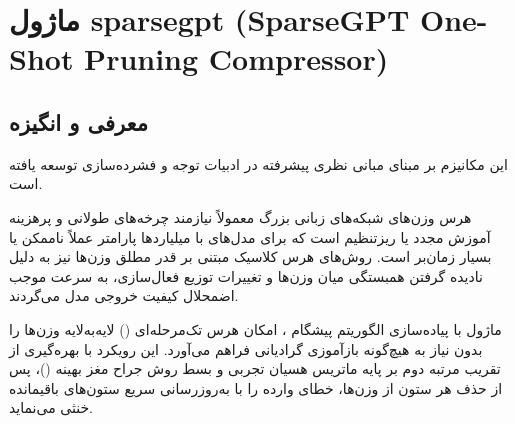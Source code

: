 \section{ماژول sparsegpt (SparseGPT One-Shot Pruning Compressor)}
\label{sec:module_sparsegpt}

\subsection{معرفی و انگیزه}
این مکانیزم بر مبنای مبانی نظری پیشرفته در ادبیات توجه و فشرده‌سازی \cite{frantar2023sparsegpt} توسعه یافته است.

هرس وزن‌های شبکه‌های زبانی بزرگ معمولاً نیازمند چرخه‌های طولانی و پرهزینه آموزش مجدد یا ریزتنظیم است که برای مدل‌های با میلیاردها پارامتر عملاً ناممکن یا بسیار زمان‌بر است. روش‌های هرس کلاسیک مبتنی بر قدر مطلق وزن‌ها نیز به دلیل نادیده گرفتن همبستگی میان وزن‌ها و تغییرات توزیع فعال‌سازی، به سرعت موجب اضمحلال کیفیت خروجی مدل می‌گردند.

ماژول  با پیاده‌سازی الگوریتم پیشگام ، امکان هرس تک‌مرحله‌ای () لایه‌به‌لایه وزن‌ها را بدون نیاز به هیچ‌گونه بازآموزی گرادیانی فراهم می‌آورد. این رویکرد با بهره‌گیری از تقریب مرتبه دوم بر پایه ماتریس هسیان تجربی و بسط روش جراح مغز بهینه ()، پس از حذف هر ستون از وزن‌ها، خطای وارده را با به‌روزرسانی سریع ستون‌های باقیمانده خنثی می‌نماید.

